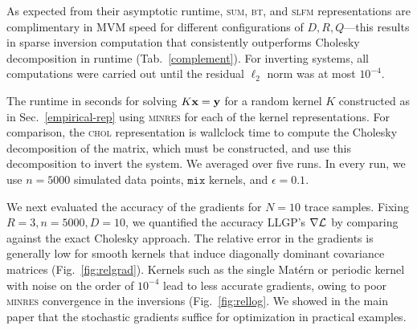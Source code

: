 \documentclass{article}
\begin{document}
As expected from their asymptotic runtime, \textsc{sum}, \textsc{bt}, and \textsc{slfm} representations are complimentary in MVM speed for different configurations of $D,R,Q$---this results in sparse inversion computation that consistently outperforms Cholesky decomposition in runtime (Tab.~\ref{complement}).
For inverting systems, all computations were carried out until the residual $\ell_2$ norm was at most $10^{-4}$.
\begin{table}[!h]
  \caption{The runtime in seconds for solving $K\textbf{x}=\textbf{y}$ for a random kernel $K$ constructed as in Sec.~\ref{empirical-rep} using \textsc{minres} for each of the kernel representations. For comparison, the \textsc{chol} representation is wallclock time to compute the Cholesky decomposition of the matrix, which must be constructed, and use this decomposition to invert the system. We averaged over five runs. In every run, we use $n=5000$ simulated data points, $\texttt{mix}$ kernels, and $\epsilon=0.1$.
}
\label{complement}
\begin{center}
  \begin{small}
    
\end{small}
\end{center}
\end{table}

We next evaluated the accuracy of the gradients for $N=10$ trace samples. Fixing $R=3,n=5000,D=10$, we quantified the accuracy LLGP's $\nabla\mathcal{L}$ by comparing against the exact Cholesky approach. The relative error in the gradients is generally low for smooth kernels that induce diagonally dominant covariance matrices (Fig.~\ref{fig:relgrad}). Kernels such as the single Mat\'{e}rn or periodic kernel with noise on the order of $10^{-4}$ lead to less accurate gradients, owing to poor \textsc{minres} convergence in the inversions (Fig.~\ref{fig:rellog}. We showed in the main paper that the stochastic gradients suffice for optimization in practical examples.
\end{document}
